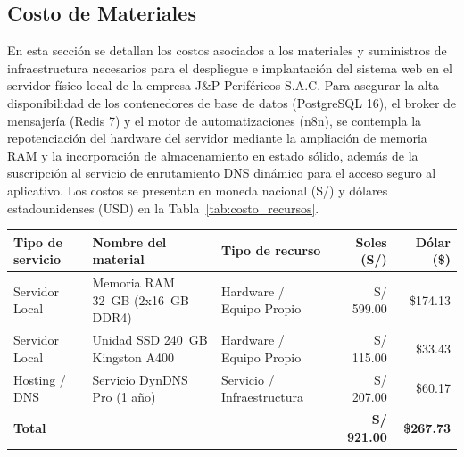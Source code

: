 \subsection{Costo de Materiales}

En esta sección se detallan los costos asociados a los materiales y 
suministros de infraestructura necesarios para el despliegue e implantación del sistema web 
en el servidor físico local de la empresa J\&P Periféricos S.A.C. 
Para asegurar la alta disponibilidad de los contenedores de base de datos (PostgreSQL 16), 
el broker de mensajería (Redis 7) y el motor de automatizaciones (n8n), 
se contempla la repotenciación del hardware del servidor mediante la ampliación de memoria RAM 
y la incorporación de almacenamiento en estado sólido, además de la suscripción al servicio de enrutamiento DNS dinámico para el acceso seguro al aplicativo. 
Los costos se presentan en moneda nacional (S/) y dólares estadounidenses (USD) en la Tabla~\ref{tab:costo_recursos}.

\par
\noindent
\begin{minipage}{\linewidth}

    \begingroup
    \renewcommand{\baselinestretch}{1}
    \footnotesize
    \setlength{\tabcolsep}{4pt}
    \renewcommand{\arraystretch}{1.25}

    \begin{tabularx}{\linewidth}{@{}p{3.2cm}p{4.2cm}p{2.8cm}r r@{}}
        \toprule
        \textbf{Tipo de servicio} & \textbf{Nombre del material} & \textbf{Tipo de recurso} & \textbf{Soles (S/)} & \textbf{Dólar (\$)} \\ \midrule
        Servidor Local & Memoria RAM 32~GB (2x16~GB DDR4) & Hardware / Equipo Propio & S/ 599.00 & \$174.13 \\ 
        Servidor Local & Unidad SSD 240~GB Kingston A400 & Hardware / Equipo Propio & S/ 115.00 & \$33.43 \\ 
        Hosting / DNS & Servicio DynDNS Pro (1 año) & Servicio / Infraestructura & S/ 207.00 & \$60.17 \\ \midrule
        \textbf{Total} & & & \textbf{S/ 921.00} & \textbf{\$267.73} \\ \bottomrule
    \end{tabularx}
    \endgroup

\end{minipage}
\finBloqueAPA